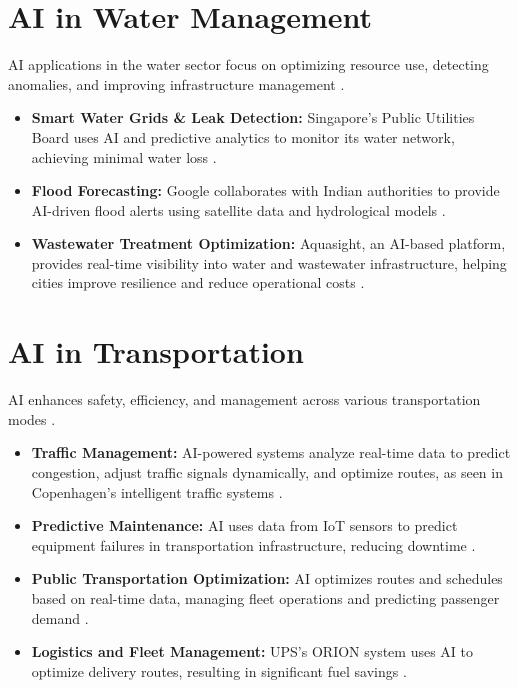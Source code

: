 \section{AI in Water Management}
AI applications in the water sector focus on optimizing resource use, detecting anomalies, and improving infrastructure management \parencite{uppcsmagazine.com}.
\begin{itemize}
    \item \textbf{Smart Water Grids \& Leak Detection:} Singapore's Public Utilities Board uses AI and predictive analytics to monitor its water network, achieving minimal water loss \parencite{uppcsmagazine.com}.
    \item \textbf{Flood Forecasting:} Google collaborates with Indian authorities to provide AI-driven flood alerts using satellite data and hydrological models \parencite{uppcsmagazine.com}.
    \item \textbf{Wastewater Treatment Optimization:} Aquasight, an AI-based platform, provides real-time visibility into water and wastewater infrastructure, helping cities improve resilience and reduce operational costs \parencite{dlt.com}.
\end{itemize}

\section{AI in Transportation}
AI enhances safety, efficiency, and management across various transportation modes \parencite{rst.software}.
\begin{itemize}
    \item \textbf{Traffic Management:} AI-powered systems analyze real-time data to predict congestion, adjust traffic signals dynamically, and optimize routes, as seen in Copenhagen's intelligent traffic systems \parencite{digitaldefynd.com}.
    \item \textbf{Predictive Maintenance:} AI uses data from IoT sensors to predict equipment failures in transportation infrastructure, reducing downtime \parencite{checkpoint.com}.
    \item \textbf{Public Transportation Optimization:} AI optimizes routes and schedules based on real-time data, managing fleet operations and predicting passenger demand \parencite{emizentech.ae}.
    \item \textbf{Logistics and Fleet Management:} UPS's ORION system uses AI to optimize delivery routes, resulting in significant fuel savings \parencite{intuz.com}.
\end{itemize}


